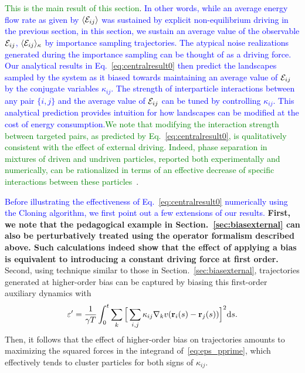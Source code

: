 \documentclass[superscriptaddress, twocolumn, prx, longbibliography, nofootinbib]{revtex4-1}
\begin{document}
\textcolor{green}{This is the main result of this section}. \textcolor{blue}{In other words, while an average energy flow rate as given by $\langle {\cal E}_{ij}\rangle$ was sustained by explicit non-equilibrium driving in the previous section, in this section, we sustain an average value of the observable ${\cal E}_{ij}$, $\langle{\cal E}_{ij}\rangle_\kappa$ by importance sampling trajectories. The atypical noise realizations generated during the importance sampling can be thought of as a driving force. Our analytical results in Eq.~\ref{eq:centralresult0} then predict the landscapes sampled by the system as it biased towards maintaining an average value of ${\cal E}_{ij}$ by the conjugate variables $\kappa_{ij}$. The strength of interparticle interactions between any pair $\{i,j\}$ and the average value of ${\cal E}_{ij}$ can be tuned by controlling $\kappa_{ij}$. This analytical prediction provides intuition for how landscapes can be modified at the cost of energy consumption.}\textcolor{green}{We note that modifying the interaction strength between targeted pairs, as predicted by Eq.~\ref{eq:centralresult0}, is qualitatively consistent with the effect of external driving. Indeed, phase separation in mixtures of driven and undriven particles, reported both experimentally and numerically, can be rationalized in terms of an effective decrease of specific interactions between these particles~\cite{delJunco2018,Han2016}}.

\textcolor{blue}{Before illustrating the effectiveness of Eq.~\ref{eq:centralresult0} numerically using the Cloning algorithm, we first point out a few extensions of our results.}
{\bf First, we note that the pedagogical example in Section.~\ref{sec:biasexternal} can also be perturbatively treated using the operator formalism described above. Such calculations indeed show that the effect of applying a bias is equivalent to introducing a constant driving force at first order.}
Second, using technique similar to those in Section.~\ref{sec:biasexternal}, trajectories generated at higher-order bias can be captured by biasing this first-order auxiliary dynamics with 
\begin{equation}\label{eq:eps_pprime}
	\varepsilon' = \frac{1}{\gamma T}\int_0^t\sum_k\Big[\sum_{i,j}\kappa_{ij} \nabla_kv({\bf r}_i(s)-{\bf r}_j(s))\Big]^2{\rm d}s .
\end{equation}
Then, it follows that the effect of higher-order bias on trajectories amounts to maximizing the squared forces in the integrand of~\eqref{eq:eps_pprime}, which effectively tends to cluster particles for both signs of $\kappa_{ij}$.
\end{document}
